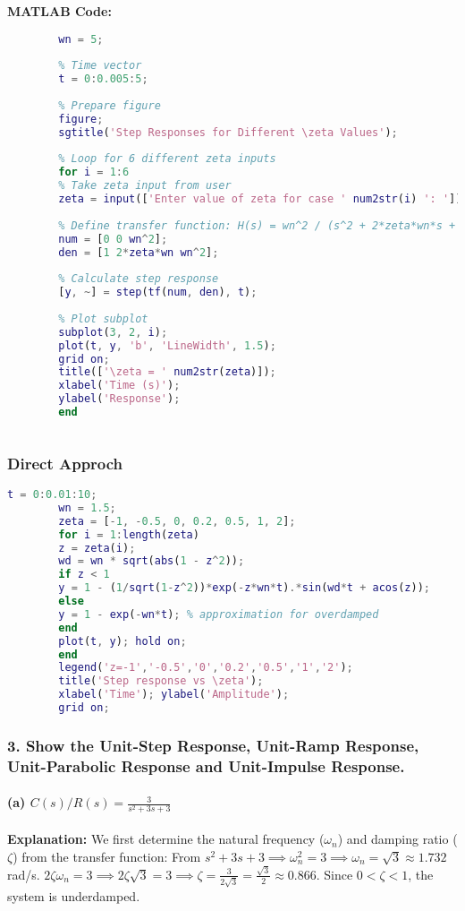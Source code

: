 \documentclass{article}
\begin{document}
	\textbf{MATLAB Code:}
		\begin{lstlisting}[language=Matlab, caption=Step response vs damping ratio (manual)]
		% Natural frequency (assumed constant)
		wn = 5;
		
		% Time vector
		t = 0:0.005:5;
		
		% Prepare figure
		figure;
		sgtitle('Step Responses for Different \zeta Values');
		
		% Loop for 6 different zeta inputs
		for i = 1:6
		% Take zeta input from user
		zeta = input(['Enter value of zeta for case ' num2str(i) ': ']);
		
		% Define transfer function: H(s) = wn^2 / (s^2 + 2*zeta*wn*s + wn^2)
		num = [0 0 wn^2];
		den = [1 2*zeta*wn wn^2];
		
		% Calculate step response
		[y, ~] = step(tf(num, den), t);
		
		% Plot subplot
		subplot(3, 2, i);
		plot(t, y, 'b', 'LineWidth', 1.5);
		grid on;
		title(['\zeta = ' num2str(zeta)]);
		xlabel('Time (s)');
		ylabel('Response');
		end
		
	\end{lstlisting}
	\subsubsection{Direct Approch}
	\begin{lstlisting}[language=Matlab, caption=Step response vs damping ratio (manual)]
		t = 0:0.01:10;
		wn = 1.5;
		zeta = [-1, -0.5, 0, 0.2, 0.5, 1, 2];
		for i = 1:length(zeta)
		z = zeta(i);
		wd = wn * sqrt(abs(1 - z^2));
		if z < 1
		y = 1 - (1/sqrt(1-z^2))*exp(-z*wn*t).*sin(wd*t + acos(z));
		else
		y = 1 - exp(-wn*t); % approximation for overdamped
		end
		plot(t, y); hold on;
		end
		legend('z=-1','-0.5','0','0.2','0.5','1','2');
		title('Step response vs \zeta');
		xlabel('Time'); ylabel('Amplitude');
		grid on;
	\end{lstlisting}
	
	
	\subsubsection*{3. Show the Unit-Step Response, Unit-Ramp Response, Unit-Parabolic Response and Unit-Impulse Response.}
	
	\paragraph{(a) $C(s)/R(s) = \frac{3}{s^2+3s+3}$}
	\textbf{Explanation:}
	We first determine the natural frequency ($\omega_n$) and damping ratio ($\zeta$) from the transfer function:
	From $s^2+3s+3 \implies \omega_n^2 = 3 \implies \omega_n = \sqrt{3} \approx 1.732$ rad/s.
	$2\zeta\omega_n = 3 \implies 2\zeta\sqrt{3} = 3 \implies \zeta = \frac{3}{2\sqrt{3}} = \frac{\sqrt{3}}{2} \approx 0.866$.
	Since $0 < \zeta < 1$, the system is underdamped.
	
\end{document}
